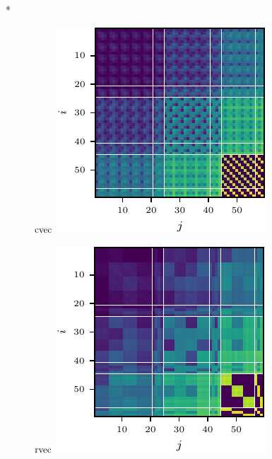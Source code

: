 \switchcolumn[1]*
\begin{figure}[!h]
  \centering
  \begin{minipage}[t]{0.495\linewidth}
    \centering
    $\operatorname{cvec}$\vspace{1ex}
    \includegraphics[width=\linewidth]{../kfs/plots/synthetic_cvec_ggn.pdf}
  \end{minipage}
  \hfill
  \begin{minipage}[t]{0.495\linewidth}
    \centering
    $\operatorname{rvec}$\vspace{1ex}
    \includegraphics[width=\linewidth]{../kfs/plots/synthetic_rvec_ggn.pdf}

\end{minipage}
\end{figure}
